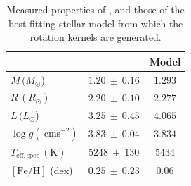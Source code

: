 \begin{table}
\centering
\begin{tabular}{|l|c|c|}
\hline
                                                  & \thestar{} & Model                  \\ \hline
$M\,(M_{\odot}$)                                   & $1.20~\pm~0.16$             & $1.293$              \\
$R\,(R_{\odot})$                                   & $2.20~\pm~0.10$             & $2.277$             \\
$L\,(L_{\odot}$)                                   & $3.25~\pm~0.45$             & $4.065$ \\
$\log{g}(\ \mathrm{cm} \mathrm{s}^{-2})$                                      & $3.83~\pm~0.04$             & $3.834$ \\
$T_{\mathrm{eff,spec}}\,(\mathrm{K})$ & $5248~\pm~130$              & $5434$     \\
$[\mathrm{Fe/H}]$ (dex)                                & $0.25~\pm~ 0.23$            & $0.06$ \\
\hline
\end{tabular}
\caption[Measured properties and best-fit stellar model parameters of KIC~12508433.]{Measured properties of \thestar{} \citep{deheuvels_seismic_2014}, and those of the best-fitting stellar model from which the rotation kernels are generated.
}
\label{tab:kictab}
\end{table}


